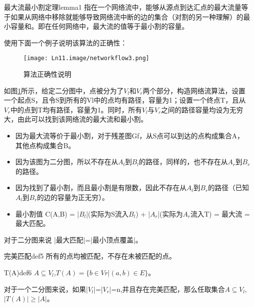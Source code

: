 \begin{lemma}{最大流最小割定理}{lemma1}
    指在一个网络流中，能够从源点到达汇点的最大流量等于如果从网络中移除就能够导致网络流中断的边的集合（对割的另一种理解）的最小容量和。即在任何网络中，最大流的值等于最小割的容量。
\end{lemma}

使用下面一个例子说明该算法的正确性：
\begin{figure}[htb]
  \centering
  \texttt{[image: Ln11.image/networkflow3.png]}
  \caption{算法正确性说明}\label{fig3}
\end{figure}

\begin{example}
  如图\ref{fig3}所示，给定二分图中，点被分为了\(V_l\)和\(V_r\)两个部分，构造网络流算法，设置一个起点S，且令S到所有的Vl中的点均有路径，容量为1；设置一个终点T，且从\(V_r\)中的点到T均有路径，容量为1。同时，所有\(V_l\)与\(V_r\)之间的路径容量均设为无穷大，由此可以找到该网络流的最大流和最小割。
\end{example}

\begin{itemize}
  \item 因为最大流等价于最小割，对于残差图Gf，从S点可以到达的点构成集合A，其他点构成集合B。
  \item 因为该图为二分图，所以不存在从\(A_l\)到\(B_l\)的路径，同样的，也不存在从\(A_r\)到\(B_r\)的路径。
  \item 因为找到了最小割，而且最小割是有限数，因此不存在从\(A_l\)到\(B_r\)的路径（已知\(A_l\)到\(B_r\)的边的容量为正无穷）。
  \item 最小割值 C(A,B) = |\(B_l\)|(实际为S流入\(B_l\)) + |\(A_r\)|(实际为\(A_r\)流入T) = 最大流 = 最大匹配。
\end{itemize}
对于二分图来说 |最大匹配|=|最小顶点覆盖|。

\begin{definition}{完美匹配}{def5}
    所有的点均被匹配，不存在未被匹配的点。
\end{definition}

\begin{definition}{T(A)}{def6}
  \(A \subseteq V_l\),\(T(A) = \{b \in Vr | (a,b) \in E \}\)。
\end{definition}

对于一个二分图来说，如果|\(V_l\)|=|\(V_r\)|=n,并且存在完美匹配，那么任取集合\(A \subseteq V_l\),\(|T(A)| \ge |A|\)。

